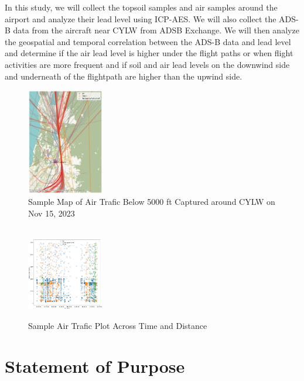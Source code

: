 \documentclass[12pt]{article}
\begin{document}
In this study, we will collect the topsoil samples and air samples around the airport and analyze their lead level using ICP-AES. We will also collect the ADS-B data from the aircraft near CYLW from ADSB Exchange\supercite{adsbexchange}. We will then analyze the geospatial and temporal correlation between the ADS-B data and lead level and determine if the air lead level is higher under the flight paths or when flight activities are more frequent and if soil and air lead levels on the downwind side and underneath of the flightpath are higher than the upwind side. 
\setlength\intextsep{-2pt}
\begin{figure}
  \begin{center}
    \includegraphics[width=0.3\textwidth]{map.png} \\
  \caption{\small{Sample Map of Air Trafic Below 5000 ft Captured around CYLW on Nov 15, 2023}}
      \label{fig:map}\\

          \includegraphics[width=0.3\textwidth]{time.png} \\
  \caption{\small{Sample Air Trafic Plot Across Time and Distance}}
      \label{fig:time}
  \end{center}
\vspace{-20pt}
\end{figure}
  
\section{Statement of Purpose}
\end{document}
